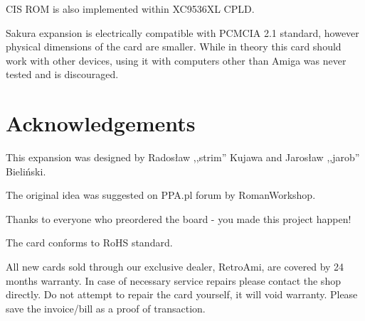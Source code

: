\documentclass[10pt,a5paper]{article}
\begin{document}
CIS ROM is also implemented within XC9536XL CPLD.

Sakura expansion is electrically compatible with PCMCIA 2.1 standard, however physical dimensions of the card are smaller. While in theory this card should work with other devices, using it with computers other than Amiga was never tested and is discouraged.

\section*{Acknowledgements}

This expansion was designed by Radosław ,,strim'' Kujawa and Jarosław ,,jarob'' Bieliński. 

The original idea was suggested on PPA.pl forum by RomanWorkshop. 

Thanks to everyone who preordered the board - you made this project happen!

The card conforms to RoHS standard. 

All new cards sold through our exclusive dealer, RetroAmi, are covered by 24 months warranty. In case of necessary service repairs please contact the shop directly. Do not attempt to repair the card yourself, it will void warranty. Please save the invoice/bill as a proof of transaction.
\end{document}

